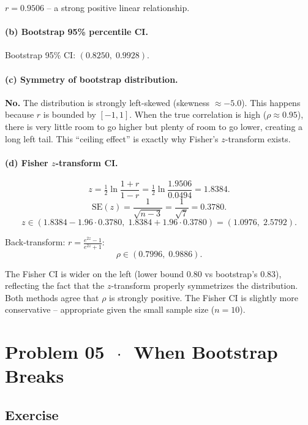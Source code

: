 \documentclass[11pt]{article}
\begin{document}
$r = 0.9506$ -- a strong positive linear relationship.

\paragraph{(b) Bootstrap 95\% percentile CI.}

Bootstrap 95\% CI: $(0.8250,\; 0.9928)$.

\paragraph{(c) Symmetry of bootstrap distribution.}

\textbf{No.} The distribution is strongly left-skewed (skewness $\approx -5.0$). This happens because $r$ is bounded by $[-1, 1]$. When the true correlation is high ($\rho \approx 0.95$), there is very little room to go higher but plenty of room to go lower, creating a long left tail. This ``ceiling effect'' is exactly why Fisher's $z$-transform exists.

\paragraph{(d) Fisher $z$-transform CI.}

\[
  z = \tfrac{1}{2}\ln\frac{1+r}{1-r}
  = \tfrac{1}{2}\ln\frac{1.9506}{0.0494}
  = 1.8384.
\]
\[
  \text{SE}(z) = \frac{1}{\sqrt{n-3}} = \frac{1}{\sqrt{7}} = 0.3780.
\]
\[
  z \in (1.8384 - 1.96 \cdot 0.3780,\; 1.8384 + 1.96 \cdot 0.3780) = (1.0976,\; 2.5792).
\]

Back-transform: $r = \frac{e^{2z} - 1}{e^{2z} + 1}$:
\[
  \rho \in (0.7996,\; 0.9886).
\]

The Fisher CI is wider on the left (lower bound 0.80 vs bootstrap's 0.83), reflecting the fact that the $z$-transform properly symmetrizes the distribution. Both methods agree that $\rho$ is strongly positive. The Fisher CI is slightly more conservative -- appropriate given the small sample size ($n = 10$).

\section*{Problem 05 \texorpdfstring{$\,\cdot\,$}{-} When Bootstrap Breaks}

\subsection*{Exercise}
\end{document}
